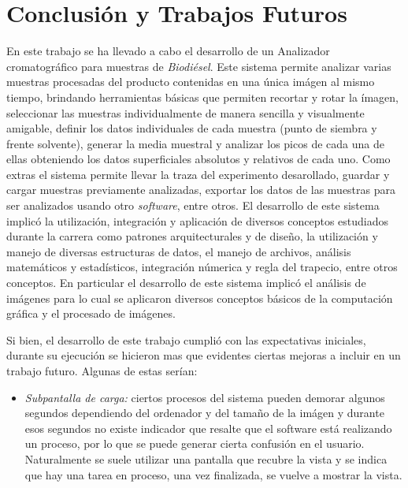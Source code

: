 \chapter{Conclusi\'on y Trabajos Futuros}
En este trabajo se ha llevado a cabo el desarrollo de un Analizador cromatogr\'afico para muestras de \textit{Biodi\'esel}. Este sistema permite analizar varias muestras procesadas del producto contenidas en una \'unica im\'agen al mismo tiempo, brindando herramientas b\'asicas que permiten recortar y rotar la \'imagen, seleccionar las muestras individualmente de manera sencilla y visualmente amigable, definir los datos individuales de cada muestra (punto de siembra y frente solvente), generar la media muestral y analizar los picos de cada una de ellas obteniendo los datos superficiales absolutos y relativos de cada uno. Como extras el sistema permite llevar la traza del experimento desarollado, guardar y cargar muestras previamente analizadas, exportar los datos de las muestras para ser analizados usando otro \textit{software}, entre otros. El desarrollo de este sistema implic\'o la utilizaci\'on, integraci\'on y aplicaci\'on de diversos conceptos estudiados durante la carrera como patrones arquitecturales y de dise\~no, la utilizaci\'on y manejo de diversas estructuras de datos, el manejo de archivos, an\'alisis matem\'aticos y estad\'isticos, integraci\'on n\'umerica y regla del trapecio, entre otros conceptos. En particular el desarrollo de este sistema implic\'o el an\'alisis de im\'agenes para lo cual se aplicaron diversos conceptos b\'asicos de la computaci\'on gr\'afica y el procesado de im\'agenes.

Si bien, el desarrollo de este trabajo cumpli\'o con las expectativas iniciales, durante su ejecuci\'on se hicieron mas que evidentes ciertas mejoras a incluir en un trabajo futuro. Algunas de estas ser\'ian:
\begin{itemize} \itemsep5pt \parskip0pt 
	\item \textit{Subpantalla de carga:} ciertos procesos del sistema pueden demorar algunos segundos dependiendo del ordenador y del tama\~no de la im\'agen y durante esos segundos no existe indicador que resalte que el software est\'a realizando un proceso, por lo que se puede generar cierta confusi\'on en el usuario. Naturalmente se suele utilizar una pantalla que recubre la vista y se indica que hay una tarea en proceso, una vez finalizada, se vuelve a mostrar la vista.
\end{itemize}
